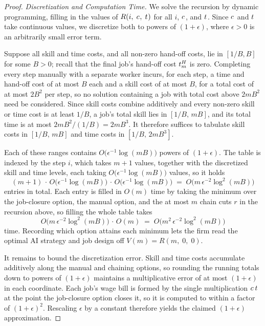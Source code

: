 \begin{proof}
\emph{Discretization and Computation Time.}
We solve the recursion by dynamic programming, filling in the values of $R(i,\; c_{},\; t_{})$ for all $i$, $c_{}$, and $t_{}$.
Since $c_{}$ and $t_{}$ take continuous values, we discretize both to powers of $(1+\epsilon)$, where $\epsilon > 0$ is an arbitrarily small error term.

Suppose all skill and time costs, and all non-zero hand-off costs, lie in $[1/B, B]$ for some $B > 0$; recall that the final job's hand-off cost $t^{H}_{m}$ is zero.
Completing every step manually with a separate worker incurs, for each step, a time and hand-off cost of at most $B$ each and a skill cost of at most $B$, for a total cost of at most $2B^2$ per step, so no solution containing a job with total cost above $2mB^2$ need be considered.
Since skill costs combine additively and every non-zero skill or time cost is at least $1/B$, a job's total skill lies in $[1/B,\, mB]$, and its total time is at most $2mB^2/(1/B) = 2mB^3$.
It therefore suffices to tabulate skill costs in $[1/B,\, mB]$ and time costs in $[1/B,\, 2mB^3]$.

Each of these ranges contains $O\bigl(\epsilon^{-1}\log(mB)\bigr)$ powers of $(1+\epsilon)$.
The table is indexed by the step $i$, which takes $m+1$ values, together with the discretized skill and time levels, each taking $O\bigl(\epsilon^{-1}\log(mB)\bigr)$ values, so it holds
\[
(m+1)\,\cdot\,O\bigl(\epsilon^{-1}\log(mB)\bigr)\,\cdot\,O\bigl(\epsilon^{-1}\log(mB)\bigr) \;=\; O\bigl(m\,\epsilon^{-2}\log^2(mB)\bigr)
\]
entries in total.
Each entry is filled in $O(m)$ time by taking the minimum over the job-closure option, the manual option, and the at most $m$ chain cuts $r$ in the recursion above, so filling the whole table takes
\[
O\bigl(m\,\epsilon^{-2}\log^2(mB)\bigr)\,\cdot\,O(m) \;=\; O\bigl(m^2\,\epsilon^{-2}\log^2(mB)\bigr)
\]
time.
Recording which option attains each minimum lets the firm read the optimal AI strategy and job design off $V(m) = R(m,\; 0,\; 0)$.

It remains to bound the discretization error.
Skill and time costs accumulate additively along the manual and chaining options, so rounding the running totals down to powers of $(1+\epsilon)$ maintains a multiplicative error of at most $(1+\epsilon)$ in each coordinate.
Each job's wage bill is formed by the single multiplication $c_{}\,t_{}$ at the point the job-closure option closes it, so it is computed to within a factor of $(1+\epsilon)^2$.
Rescaling $\epsilon$ by a constant therefore yields the claimed $(1+\epsilon)$ approximation.
\end{proof}

